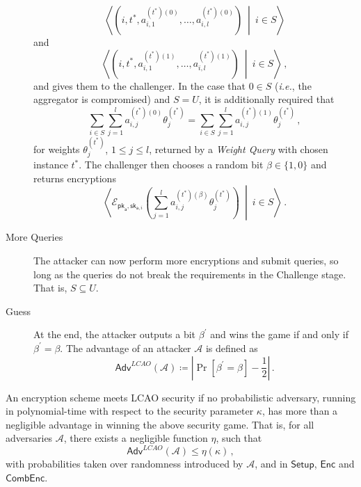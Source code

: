 \begin{description}
    \begin{equation*}
        \left\langle\left(i,t^*,a^{(t^*)(0)}_{i,1},\dots,a^{(t^*)(0)}_{i,l}\right)\ \middle|\ i \in S\right\rangle
    \end{equation*}
    and
    \begin{equation*}
        \left\langle\left(i,t^*,a^{(t^*)(1)}_{i,1},\dots,a^{(t^*)(1)}_{i,l}\right)\ \middle|\ i \in S\right\rangle\,,
    \end{equation*}
    and gives them to the challenger. In the case that $0 \in S$ (\textit{i.e.}, the aggregator is compromised) and $S = U$, it is additionally required that
    \begin{equation*}
        \sum_{i\in S}\sum^{l}_{j=1} a^{(t^*)(0)}_{i,j}\theta^{(t^*)}_j = \sum_{i \in S}\sum^{l}_{j=1} a^{(t^*)(1)}_{i,j}\theta^{(t^*)}_j\,,
    \end{equation*}
    for weights $\theta^{(t^*)}_j$, $1\leq j\leq l$, returned by a \textit{Weight Query} with chosen instance $t^*$. The challenger then chooses a random bit $\beta \in \{1,0\}$ and returns encryptions 
    \begin{equation*}
        \left\langle\mathcal{E}_{\mathsf{pk}_{\mathsf{a}},\mathsf{sk}_{\mathsf{a}, i}}\left(\sum^l_{j=1}a^{(t^*)(\beta)}_{i,j}\theta^{(t^*)}_j\right)\ \middle|\ i\in S\right\rangle\,.
    \end{equation*}
    \item[More Queries] The attacker can now perform more encryptions and submit queries, so long as the queries do not break the requirements in the Challenge stage. That is, $S \subseteq U$.
    \item[Guess] At the end, the attacker outputs a bit $\beta^\prime$ and wins the game if and only if $\beta^\prime = \beta$. The advantage of an attacker $\mathcal{A}$ is defined as
    \begin{equation*}
        \mathsf{Adv}^{LCAO}(\mathcal{A}) \coloneqq \left\lvert \Pr [\beta^\prime=\beta] - \frac{1}{2}\right\rvert\,.
    \end{equation*} 
\end{description}

\begin{definition}
    An encryption scheme meets LCAO security if no probabilistic adversary, running in polynomial-time with respect to the security parameter $\kappa$, has more than a negligible advantage in winning the above security game. That is, for all adversaries $\mathcal{A}$, there exists a negligible function $\eta$, such that
    \begin{equation*}
        \mathsf{Adv}^{LCAO}(\mathcal{A}) \leq \eta(\kappa)\,,
    \end{equation*}
    with probabilities taken over randomness introduced by $\mathcal{A}$, and in $\mathsf{Setup}$, $\mathsf{Enc}$ and $\mathsf{CombEnc}$.
\end{definition}

